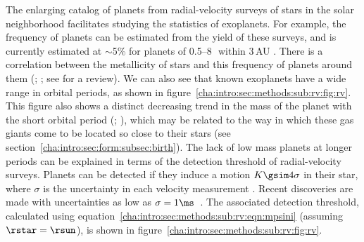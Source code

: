 The enlarging catalog of planets from radial-velocity surveys of stars in the solar neighborhood facilitates studying the statistics of exoplanets.
For example, the frequency of planets can be estimated from the yield of these surveys, and is currently estimated at $\sim$5\% for planets of 0.5--8\,\mjup\ within 3\,AU \citep{Udry_Fischer_Queloz:PPV2007a}.
There is a correlation between the metallicity of stars and this frequency of planets around them (\citealp{Gonzalez:mnras:1997a, Fischer_Valenti:asp:2003a}; \citealp*{Santos_Israelian_Mayor:aa:2004a}; see \citealp{Gonzalez:pasp:2006a} for a review).
We can also see that known exoplanets have a wide range in orbital periods, as shown in figure~\ref{cha:intro:sec:methods:sub:rv:fig:rv}.
This figure also shows a distinct decreasing trend in the mass of the planet with the short orbital period (\citealp{Zucker_Mazeh:apjl:2002a}; \citealp*{Udry_Mayor_Santos:aa:2003a}), which may be related to the way in which these gas giants come to be located so close to their stars (see section~\ref{cha:intro:sec:form:subsec:birth}).
The lack of low mass planets at longer periods can be explained in terms of the detection threshold of radial-velocity surveys.
Planets can be detected if they induce a motion $K\gsim4\sigma$ in their star, where $\sigma$ is the uncertainty in each velocity measurement \citep*{Marcy_Cochran_Mayor:PPIV:2000a}.
Recent discoveries are made with uncertainties as low as $\sigma=1\ms$~\citep{Lovis_Mayor_Pepe:nat:2006a}.
The associated detection threshold, calculated using equation~\ref{cha:intro:sec:methods:sub:rv:eqn:mpsini} (assuming $\rstar=\rsun$), is shown in figure~\ref{cha:intro:sec:methods:sub:rv:fig:rv}.

